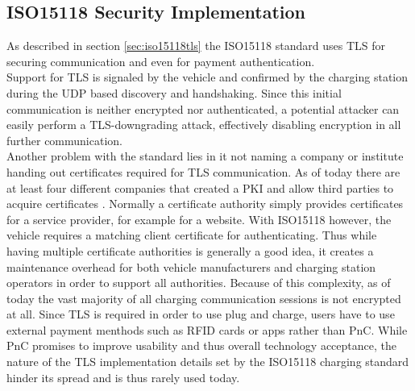 \documentclass[conference,flushend]{iaria} %
\begin{document}
\subsection{ISO15118 Security Implementation}
As described in section \ref{sec:iso15118tls} the ISO15118 standard uses TLS for securing communication and even for payment authentication. \\
Support for TLS is signaled by the vehicle and confirmed by the charging station during the UDP based discovery and handshaking.
Since this initial communication is neither encrypted nor authenticated, a potential attacker can easily perform a TLS-downgrading attack, effectively disabling encryption in all further communication. \\
Another problem with the standard lies in it not naming a company or institute handing out certificates required for TLS communication.
As of today there are at least four different companies that created a PKI and allow third parties to acquire certificates \cite{charin_charin_nodate, hubject_download_nodate, nexusgroup_identities_nodate, irdeto_irdeto_nodate}.
Normally a certificate authority simply provides certificates for a service provider, for example for a website.
With ISO15118 however, the vehicle requires a matching client certificate for authenticating.
Thus while having multiple certificate authorities is generally a good idea, it creates a maintenance overhead for both vehicle manufacturers and charging station operators in order to support all authorities.
Because of this complexity, as of today the vast majority of all charging communication sessions is not encrypted at all.
Since TLS is required in order to use plug and charge, users have to use external payment menthods such as RFID cards or apps rather than PnC.
While PnC promises to improve usability and thus overall technology acceptance, the nature of the TLS implementation details set by the ISO15118 charging standard hinder its spread and is thus rarely used today.
\end{document}

